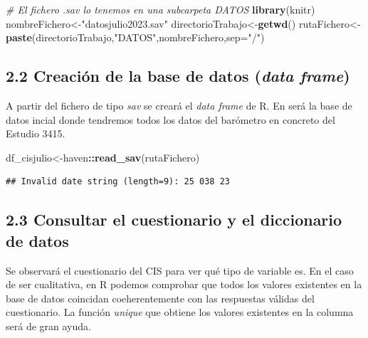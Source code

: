 \documentclass[
]{article}
\newenvironment{Shaded}{\begin{snugshade}}{\end{snugshade}}
\newcommand{\AttributeTok}[1]{\textcolor[rgb]{0.13,0.29,0.53}{#1}}
\newcommand{\CommentTok}[1]{\textcolor[rgb]{0.56,0.35,0.01}{\textit{#1}}}
\newcommand{\FunctionTok}[1]{\textcolor[rgb]{0.13,0.29,0.53}{\textbf{#1}}}
\newcommand{\NormalTok}[1]{#1}
\newcommand{\OtherTok}[1]{\textcolor[rgb]{0.56,0.35,0.01}{#1}}
\newcommand{\SpecialCharTok}[1]{\textcolor[rgb]{0.81,0.36,0.00}{\textbf{#1}}}
\newcommand{\StringTok}[1]{\textcolor[rgb]{0.31,0.60,0.02}{#1}}
\begin{document}
\begin{Shaded}
\begin{Highlighting}[]
\CommentTok{\# El fichero .sav lo tenemos en una subcarpeta DATOS}
\FunctionTok{library}\NormalTok{(knitr)}
\NormalTok{nombreFichero}\OtherTok{\textless{}{-}}\StringTok{"datosjulio2023.sav"}
\NormalTok{directorioTrabajo}\OtherTok{\textless{}{-}}\FunctionTok{getwd}\NormalTok{()}
\NormalTok{rutaFichero}\OtherTok{\textless{}{-}}\FunctionTok{paste}\NormalTok{(directorioTrabajo,}\StringTok{"DATOS"}\NormalTok{,nombreFichero,}\AttributeTok{sep=}\StringTok{"/"}\NormalTok{)}
\end{Highlighting}
\end{Shaded}

\hypertarget{creaciuxf3n-de-la-base-de-datos-data-frame}{%
\subsection{\texorpdfstring{2.2 Creación de la base de datos (\emph{data
frame})}{2.2 Creación de la base de datos (data frame)}}\label{creaciuxf3n-de-la-base-de-datos-data-frame}}

A partir del fichero de tipo \emph{sav} se creará el \emph{data frame}
de R. En será la base de datos incial donde tendremos todos los datos
del barómetro en concreto del Estudio 3415.

\begin{Shaded}
\begin{Highlighting}[]
\NormalTok{df\_cisjulio}\OtherTok{\textless{}{-}}\NormalTok{haven}\SpecialCharTok{::}\FunctionTok{read\_sav}\NormalTok{(rutaFichero)      }
\end{Highlighting}
\end{Shaded}

\begin{verbatim}
## Invalid date string (length=9): 25 038 23
\end{verbatim}

\hypertarget{consultar-el-cuestionario-y-el-diccionario-de-datos}{%
\subsection{2.3 Consultar el cuestionario y el diccionario de
datos}\label{consultar-el-cuestionario-y-el-diccionario-de-datos}}

Se observará el cuestionario del CIS para ver qué tipo de variable es.
En el caso de ser cualitativa, en R podemos comprobar que todos los
valores existentes en la base de datos coincidan coeherentemente con las
respuestas válidas del cuestionario. La función \emph{unique} que
obtiene los valores existentes en la columna será de gran ayuda.
\end{document}
